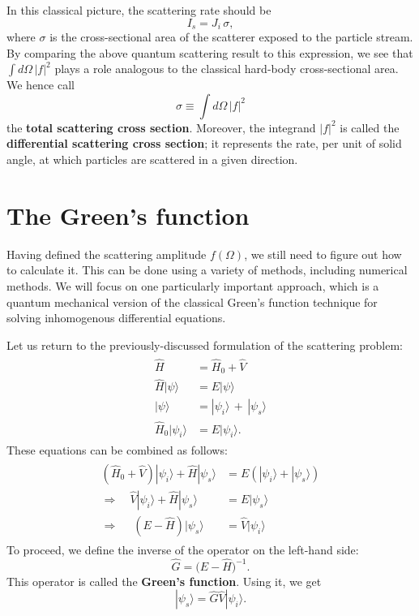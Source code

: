 \documentclass[pra,12pt]{revtex4}
\begin{document}
In this classical picture, the scattering rate should be
\begin{equation}
  I_s = J_i \, \sigma,
\end{equation}
where $\sigma$ is the cross-sectional area of the scatterer exposed to
the particle stream.  By comparing the above quantum scattering result
to this expression, we see that $\int d\Omega\,|f|^2$ plays a role
analogous to the classical hard-body cross-sectional area.  We hence
call
\begin{equation}
  \sigma \equiv \int d\Omega\,|f|^2
\end{equation}
the \textbf{total scattering cross section}.  Moreover, the integrand
$|f|^2$ is called the \textbf{differential scattering cross section};
it represents the rate, per unit of solid angle, at which particles
are scattered in a given direction.

\section{The Green's function}
\label{sec:greensfun}

Having defined the scattering amplitude $f(\Omega)$, we still need to
figure out how to calculate it.  This can be done using a variety of
methods, including numerical methods.  We will focus on one
particularly important approach, which is a quantum mechanical version
of the classical Green's function technique for solving inhomogenous
differential equations.

Let us return to the previously-discussed formulation of the
scattering problem:
\begin{align}
  \begin{aligned} \hat{H} &= \hat{H}_0+\hat{V} \\ \hat{H} |\psi\rangle &= E |\psi\rangle \\ |\psi\rangle &= |\psi_i\rangle \,+\, |\psi_s\rangle \\ \hat{H}_0 |\psi_i\rangle &= E |\psi_i\rangle.\end{aligned}
\end{align}
These equations can be combined as follows:
\begin{align}
  \begin{aligned} \left(\hat{H}_0 + \hat{V}\right) |\psi_i\rangle + \hat{H} |\psi_s\rangle &= E \left( |\psi_i\rangle + |\psi_s\rangle \right) \\ \Rightarrow \quad \hat{V} |\psi_i\rangle + \hat{H} |\psi_s\rangle &= E |\psi_s\rangle  \\ \Rightarrow \quad\; \left(E - \hat{H}\right) |\psi_s\rangle & = \hat{V} |\psi_i\rangle
  \end{aligned}
\end{align}
To proceed, we define the inverse of the operator on the left-hand
side:
\begin{equation}
  \hat{G} = \big(E-\hat{H}\big)^{-1}.
\end{equation}
This operator is called the \textbf{Green's function}.  Using it, we
get
\begin{equation}
  |\psi_s\rangle = \hat{G} \hat{V} |\psi_i\rangle.
\end{equation}
\end{document}
